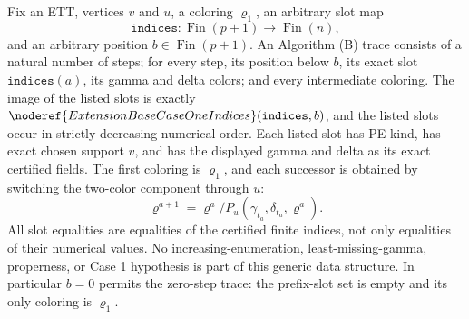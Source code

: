 \begin{definition}
Fix an ETT, vertices \(v\) and \(u\), a coloring \(\varrho_1\), an
arbitrary slot map
\[
 \mathtt{indices}:\operatorname{Fin}(p+1)\longrightarrow
                  \operatorname{Fin}(n),
\]
and an arbitrary position \(b\in\operatorname{Fin}(p+1)\).  An Algorithm
(B) trace consists of a natural number of steps; for every step, its
position below \(b\), its exact slot \(\mathtt{indices}(a)\), its gamma
and delta colors; and every intermediate coloring.  The image of the
listed slots is exactly
\(\noderef{ExtensionBaseCaseOneIndices}(\mathtt{indices},b)\), and the
listed slots occur in strictly decreasing numerical order.  Each listed
slot has PE kind, has exact chosen support \(v\), and has the displayed
gamma and delta as its exact certified fields.  The first coloring is
\(\varrho_1\), and each successor is obtained by switching the two-color
component through \(u\):
\[
 \varrho^{a+1}=\varrho^a/P_u
       (\gamma_{t_a},\delta_{t_a},\varrho^a).
\]
All slot equalities are equalities of the certified finite indices, not
only equalities of their numerical values.  No increasing-enumeration,
least-missing-gamma, properness, or Case 1 hypothesis is part of this
generic data structure.  In particular \(b=0\) permits the zero-step trace:
the prefix-slot set is empty and its only coloring is \(\varrho_1\).
\end{definition}
